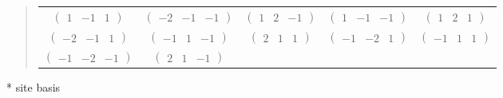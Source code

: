 \documentclass[fleqn,9pt,landscape]{jsarticle}
\begin{document}
\begin{quote}
\begin{tabular}{ccccc}
$ \begin{pmatrix} 1 & -1 & 1 \end{pmatrix} $ & $ \begin{pmatrix} -2 & -1 & -1 \end{pmatrix} $ & $ \begin{pmatrix} 1 & 2 & -1 \end{pmatrix} $ & $ \begin{pmatrix} 1 & -1 & -1 \end{pmatrix} $ & $ \begin{pmatrix} 1 & 2 & 1 \end{pmatrix} $ \\
$ \begin{pmatrix} -2 & -1 & 1 \end{pmatrix} $ & $ \begin{pmatrix} -1 & 1 & -1 \end{pmatrix} $ & $ \begin{pmatrix} 2 & 1 & 1 \end{pmatrix} $ & $ \begin{pmatrix} -1 & -2 & 1 \end{pmatrix} $ & $ \begin{pmatrix} -1 & 1 & 1 \end{pmatrix} $ \\
$ \begin{pmatrix} -1 & -2 & -1 \end{pmatrix} $ & $ \begin{pmatrix} 2 & 1 & -1 \end{pmatrix} $ & $  $ & $  $ & $  $
\end{tabular}
\end{quote}
* site basis
\end{document}
